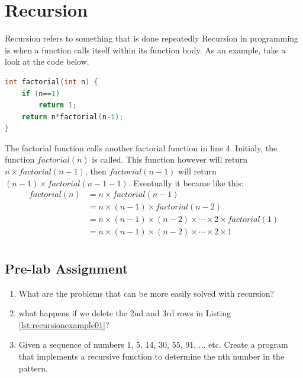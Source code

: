 \section{Recursion}
Recursion refers to something that is done repeatedly
Recursion in programming is when a function calls itself within its function body.
As an example, take a look at the code below.
\begin{lstlisting}[language=c,caption = Factorial with a recursion,label=lst:recursionexample01]
    int factorial(int n) {
    if (n==1)
        return 1;
    return n*factorial(n-1);
}
\end{lstlisting}
The factorial function calls another factorial function in line 4.
Initialy, the function $factorial(n)$ is called. This function however will return
$n\times factorial(n-1)$, then $factorial(n-1)$ will return $(n-1)\times factorial(n-1-1)$.
Eventually it became like this:
\begin{equation*}
    \begin{split}
        factorial(n)& = n \times factorial(n-1)\\
        & = n \times (n-1) \times factorial(n-2)\\
        & = n \times (n-1) \times (n-2) \times \cdots \times 2 \times factorial(1)\\
        & = n \times (n-1) \times (n-2) \times \cdots \times 2 \times 1\\
    \end{split}
\end{equation*}

\subsection{Pre-lab Assignment}
\begin{enumerate}
    \item What are the problems that can be more easily solved with recursion?
    \item what happens if we delete the 2nd and 3rd rows in Listing \ref{lst:recursionexample01}?
    \item Given a sequence of numbers 1, 5, 14, 30, 55, 91, ... etc. Create a program that implements a recursive function to determine the nth number in the pattern.
\end{enumerate}